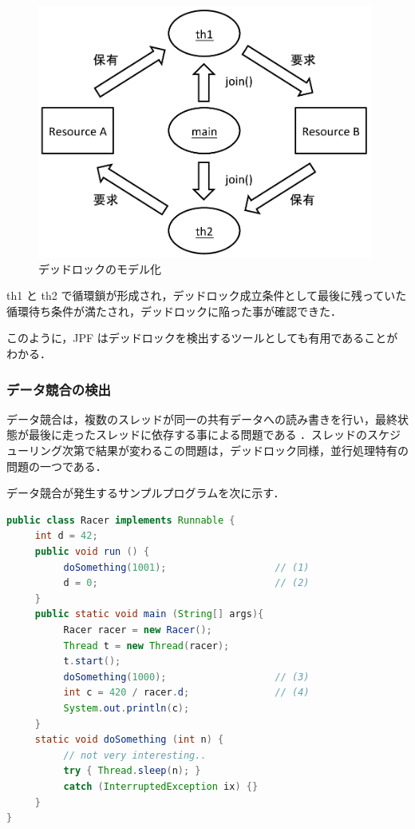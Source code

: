 \documentclass[a4j,12pt]{jarticle}
\begin{document}
\begin{figure}[here]
\centering
\includegraphics[width=11cm]{images/deadlock-search.pdf}
\caption{デッドロックのモデル化}
\label{figure:deadlock-search}
\end{figure}

th1 と th2 で循環鎖が形成され，デッドロック成立条件として最後に残っていた循環待ち条件が満たされ，デッドロックに陥った事が確認できた．

このように，JPF はデッドロックを検出するツールとしても有用であることがわかる．

\subsubsection{データ競合の検出}

データ競合は，複数のスレッドが同一の共有データへの読み書きを行い，最終状態が最後に走ったスレッドに依存する事による問題である \cite{MOS2}．スレッドのスケジューリング次第で結果が変わるこの問題は，デッドロック同様，並行処理特有の問題の一つである．

データ競合が発生するサンプルプログラムを次に示す．

\begin{lstlisting}[label=src:ex-exception, caption=データ競合の検出,language=Java]
public class Racer implements Runnable {
     int d = 42;
     public void run () {
          doSomething(1001);                   // (1)
          d = 0;                               // (2)
     }
     public static void main (String[] args){
          Racer racer = new Racer();
          Thread t = new Thread(racer);
          t.start();
          doSomething(1000);                   // (3)
          int c = 420 / racer.d;               // (4)
          System.out.println(c);
     }
     static void doSomething (int n) {
          // not very interesting..
          try { Thread.sleep(n); }
          catch (InterruptedException ix) {}
     }
}
\end{lstlisting}
\end{document}
